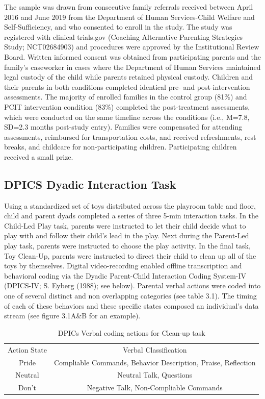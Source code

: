 \documentclass[12pt]{./styles/outhesis}
\begin{document}
The sample was drawn from consecutive family referrals received between
April 2016 and June 2019 from the Department of Human Services-Child
Welfare and Self-Sufficiency, and who consented to enroll in the study.
The study was registered with clinical trials.gov (Coaching Alternative
Parenting Strategies Study; NCT02684903) and procedures were approved by
the Institutional Review Board. Written informed consent was obtained
from participating parents and the family's caseworker in cases where
the Department of Human Services maintained legal custody of the child
while parents retained physical custody. Children and their parents in
both conditions completed identical pre- and post-intervention
assessments. The majority of enrolled families in the control group
(81\%) and PCIT intervention condition (83\%) completed the
post-treatment assessments, which were conducted on the same timeline
across the conditions (i.e., M=7.8, SD=2.3 months post-study entry).
Families were compensated for attending assessments, reimbursed for
transportation costs, and received refreshments, rest breaks, and
childcare for non-participating children. Participating children
received a small prize.

\subsection{DPICS Dyadic Interaction Task}\label{dpics-dyadic-interaction-task}
Using a standardized set of toys distributed across the playroom table
and floor, child and parent dyads completed a series of three 5-min
interaction tasks. In the Child-Led Play task, parents were instructed
to let their child decide what to play with and follow their child's
lead in the play. Next during the Parent-Led play task, parents were
instructed to choose the play activity. In the final task, Toy
Clean-Up, parents were instructed to direct their child to clean up all
of the toys by themselves. Digital video-recording enabled offline
transcription and behavioral coding via the Dyadic Parent-Child
Interaction Coding System-IV (DPICS-IV; S. Eyberg (1988); see below).
Parental verbal actions were coded into one of several distinct and non
overlapping categories (see table 3.1). The timing of each of these
behaviors and these specific states composed an individual's data stream
(see figure 3.1A\&B for an example).

\begin{table}
    \centering
    \begin{tabular}{cc}
        Action State & Verbal Classification\\
        Pride & Compliable Commands, Behavior Description, Praise, Reflection \\
        Neutral & Neutral Talk, Questions \\
        Don't & Negative Talk, Non-Compliable Commands \\
    \end{tabular}
    \caption{DPICs Verbal coding actions for Clean-up task}
    \label{tab:my_label}
\end{table}
\end{document}
